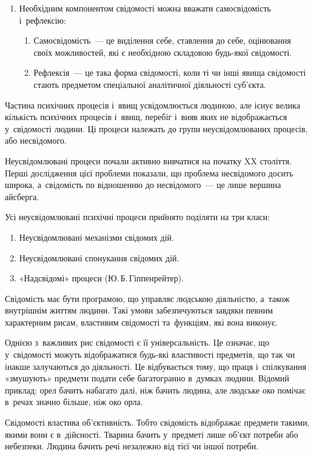 \documentclass[a5paper,oneside,DIV=12,12pt,headings=small]{scrartcl}
\begin{document}
\begin{enumerate}
			\item Необхідним компонентом свідомості можна вважати самосвідомість і~рефлексію:
			\begin{enumerate}
				\item Самосвідомість~— це виділення себе, ставлення до себе, оцінювання своїх можливостей, які є необхідною складовою будь-якої свідомості.
				\item Рефлексія~— це така форма свідомості, коли ті чи інші явища свідомості стають предметом спеціальної аналітичної діяльності суб'\-єкта.
			\end{enumerate}
			\end{enumerate}

		Частина психічних процесів і~явищ усвідомлюється людиною, але існує велика кількість психічних процесів і~явищ, перебіг і~вияв яких не відображається у~свідомості людини. Ці процеси належать до групи неусвідомлюваних процесів, або несвідомого.
		
		Неусвідомлювані процеси почали активно вивчатися на початку XX століття. Перші дослідження цієї проблеми показали, що проблема несвідомого досить широка, а~свідомість по відношенню до несвідомого~— це лише вершина айсберга.

		Усі неусвідомлювані психічні процеси прийнято поділяти на три класи:
		\begin{enumerate}
			\item Неусвідомлювані механізми свідомих дій.
			\item Неусвідомлювані спонукання свідомих дій.
			\item «Надсвідомі» процеси (Ю.\,Б.\,Гіппенрейтер).
		\end{enumerate}

		Свідомість має бути програмою, що управляє людською діяльністю, а~також внутрішнім життям людини. Такі умови забезпечуються завдяки певним характерним рисам, властивим свідомості та~функціям, які вона виконує.

		Однією з~важливих рис свідомості є її універсальність. Це означає, що у~свідомості можуть відображатися будь-які властивості предметів, що так чи інакше залучаються до діяльності. Це відбувається тому, що праця і~спілкування «змушують» предмети подати себе багатогранно в~думках людини. Відомий приклад: орел бачить набагато далі, ніж бачить людина, але людське око помічає в~речах значно більше, ніж око орла.

		Свідомості властива об'\-єк\-тив\-ність. Тобто свідомість відображає предмети такими, якими вони є в~дійсності. Тварина бачить у~предметі лише об'\-єкт потреби або небезпеки. Людина бачить речі незалежно від тієї чи іншої потреби.
\end{document}
